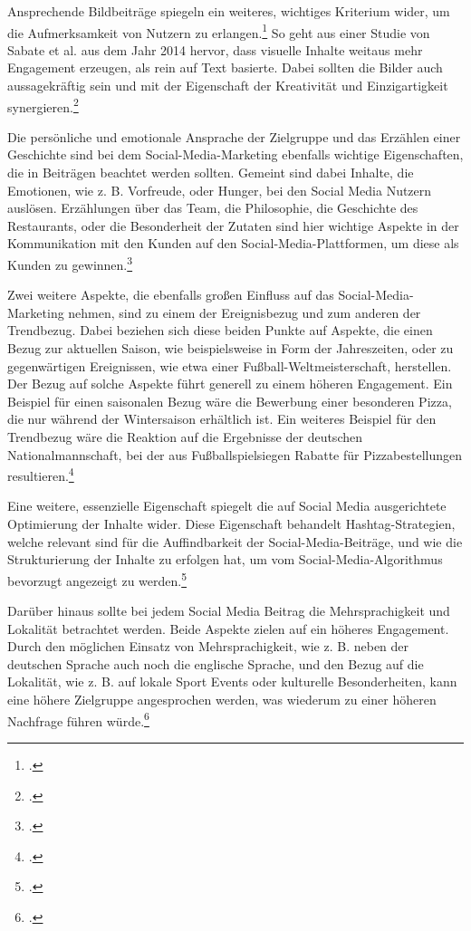 Ansprechende Bildbeiträge spiegeln ein weiteres, wichtiges Kriterium wider, um die Aufmerksamkeit von Nutzern zu erlangen.\footcite{davidson_social_media}
So geht aus einer Studie von Sabate et al. aus dem Jahr 2014 hervor, dass visuelle Inhalte weitaus mehr Engagement erzeugen, als rein auf Text basierte.
Dabei sollten die Bilder auch aussagekräftig sein und mit der Eigenschaft der Kreativität und Einzigartigkeit synergieren.\footcite{sabate_factors}

Die persönliche und emotionale Ansprache der Zielgruppe und das Erzählen einer Geschichte sind bei dem Social-Media-Marketing ebenfalls wichtige Eigenschaften, die in Beiträgen beachtet werden sollten.
Gemeint sind dabei Inhalte, die Emotionen, wie z. B. Vorfreude, oder Hunger, bei den Social Media Nutzern auslösen.
Erzählungen über das Team, die Philosophie, die Geschichte des Restaurants, oder die Besonderheit der Zutaten sind hier wichtige Aspekte in der Kommunikation mit den Kunden auf den Social-Media-Plattformen, um diese als Kunden zu gewinnen.\footcite{book}

Zwei weitere Aspekte, die ebenfalls großen Einfluss auf das Social-Media-Marketing nehmen, sind zu einem der Ereignisbezug und zum anderen der Trendbezug.
Dabei beziehen sich diese beiden Punkte auf Aspekte, die einen Bezug zur aktuellen Saison, wie beispielsweise in Form der Jahreszeiten, oder zu gegenwärtigen Ereignissen, wie etwa einer Fußball-Weltmeisterschaft, herstellen.
Der Bezug auf solche Aspekte führt generell zu einem höheren Engagement.
Ein Beispiel für einen saisonalen Bezug wäre die Bewerbung einer besonderen Pizza, die nur während der Wintersaison erhältlich ist.
Ein weiteres Beispiel für den Trendbezug wäre die Reaktion auf die Ergebnisse der deutschen Nationalmannschaft, bei der aus Fußballspielsiegen Rabatte für Pizzabestellungen resultieren.\footcite{inbook}

Eine weitere, essenzielle Eigenschaft spiegelt die auf Social Media ausgerichtete Optimierung der Inhalte wider.
Diese Eigenschaft behandelt Hashtag-Strategien, welche relevant sind für die Auffindbarkeit der Social-Media-Beiträge, und wie die Strukturierung der Inhalte zu erfolgen hat, um vom Social-Media-Algorithmus bevorzugt angezeigt zu werden.\footcite{social_media_marketing}

Darüber hinaus sollte bei jedem Social Media Beitrag die Mehrsprachigkeit und Lokalität betrachtet werden.
Beide Aspekte zielen auf ein höheres Engagement.
Durch den möglichen Einsatz von Mehrsprachigkeit, wie z. B. neben der deutschen Sprache auch noch die englische Sprache, und den Bezug auf die Lokalität, wie z. B. auf lokale Sport Events oder kulturelle Besonderheiten, kann eine höhere Zielgruppe angesprochen werden, was wiederum zu einer höheren Nachfrage führen würde.\footcite{global_marketing_advertising}


